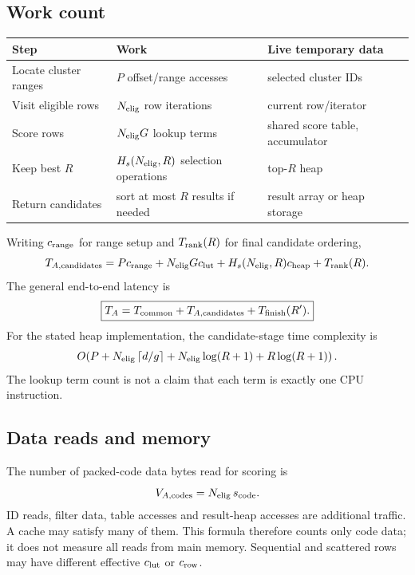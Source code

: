 \subsection{Work count}
\begin{center}\small
\begin{tabularx}{\linewidth}{@{}P{.25\linewidth}YP{.23\linewidth}@{}}\toprule
Step & Work & Live temporary data\\\midrule
Locate cluster ranges & $P$ offset/range accesses & selected cluster IDs\\
Visit eligible rows & $N_{\mathrm{elig}}$ row iterations & current row/iterator\\
Score rows & $N_{\mathrm{elig}} G$ lookup terms & shared score table, accumulator\\
Keep best $R$ & $H_s(N_{\mathrm{elig}},R)$ selection operations & top-$R$ heap\\
Return candidates & sort at most $R$ results if needed & result array or heap storage\\\bottomrule
\end{tabularx}\normalsize\end{center}

Writing $c_{\rm range}$ for range setup and $T_{\rm rank}(R)$ for final candidate ordering,
\begin{equation}
T_{A,\rm candidates}=P c_{\rm range}+N_{\mathrm{elig}} G c_{\rm lut}
                    +H_s(N_{\mathrm{elig}},R)c_{\rm heap}+T_{\rm rank}(R).
\label{eq:scan-time}
\end{equation}
The general end-to-end latency is
\begin{equation}
\boxed{T_A=T_{\mathrm{common}}+T_{A,\rm candidates}+T_{\mathrm{finish}}(R').}
\label{eq:scan-total}
\end{equation}
For the stated heap implementation, the candidate-stage time complexity is
\[
O\!\left(P+N_{\mathrm{elig}}\left\lceil d/g\right\rceil+N_{\mathrm{elig}}\log(R+1)+R\log(R+1)\right).
\]
The lookup term count is not a claim that each term is exactly one CPU instruction.

\subsection{Data reads and memory}
The number of packed-code data bytes read for scoring is
\begin{equation}
V_{A,\rm codes}=N_{\mathrm{elig}}\,s_{\rm code}.
\end{equation}
ID reads, filter data, table accesses and result-heap accesses are additional traffic. A cache
may satisfy many of them. This formula therefore counts only code data; it does not measure all reads from main memory.
Sequential and scattered rows may have different effective $c_{\rm lut}$ or $c_{\rm row}$.

